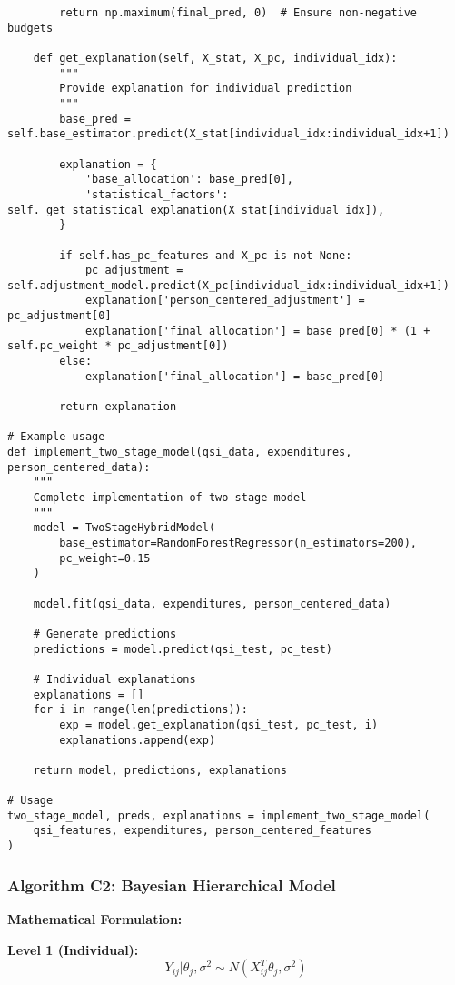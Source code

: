 \documentclass[12pt]{article}
\begin{document}
\begin{lstlisting}
        return np.maximum(final_pred, 0)  # Ensure non-negative budgets
    
    def get_explanation(self, X_stat, X_pc, individual_idx):
        """
        Provide explanation for individual prediction
        """
        base_pred = self.base_estimator.predict(X_stat[individual_idx:individual_idx+1])
        
        explanation = {
            'base_allocation': base_pred[0],
            'statistical_factors': self._get_statistical_explanation(X_stat[individual_idx]),
        }
        
        if self.has_pc_features and X_pc is not None:
            pc_adjustment = self.adjustment_model.predict(X_pc[individual_idx:individual_idx+1])
            explanation['person_centered_adjustment'] = pc_adjustment[0]
            explanation['final_allocation'] = base_pred[0] * (1 + self.pc_weight * pc_adjustment[0])
        else:
            explanation['final_allocation'] = base_pred[0]
            
        return explanation

# Example usage
def implement_two_stage_model(qsi_data, expenditures, person_centered_data):
    """
    Complete implementation of two-stage model
    """
    model = TwoStageHybridModel(
        base_estimator=RandomForestRegressor(n_estimators=200),
        pc_weight=0.15
    )
    
    model.fit(qsi_data, expenditures, person_centered_data)
    
    # Generate predictions
    predictions = model.predict(qsi_test, pc_test)
    
    # Individual explanations
    explanations = []
    for i in range(len(predictions)):
        exp = model.get_explanation(qsi_test, pc_test, i)
        explanations.append(exp)
    
    return model, predictions, explanations

# Usage
two_stage_model, preds, explanations = implement_two_stage_model(
    qsi_features, expenditures, person_centered_features
)
\end{lstlisting}

\subsubsection{Algorithm C2: Bayesian Hierarchical Model}

\textbf{Mathematical Formulation:}

\textbf{Level 1 (Individual):}
\begin{equation}
Y_{ij} | \theta_j, \sigma^2 \sim N(X_{ij}^T\theta_j, \sigma^2)
\end{equation}
\end{document}
